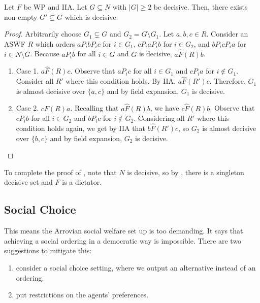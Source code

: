 	\begin{lemma}
		\label{lem: arrow group contraction}
		Let $F$ be WP and IIA. Let $G \subseteq N$ with $|G| \ge 2$ be decisive. Then, there exists non-empty $G' \subsetneq G$ which is decisive.
	\end{lemma}
	\begin{proof}
		Arbitrarily choose $G_1 \subsetneq G$ and $G_2 = G \setminus G_1$. Let $a,b,c \in R$. Consider an ASWF $R$ which orders $a P_i b P_i c$ for $i \in G_1$, $c P_i a P_i b$ for $i \in G_2$, and $b P_i c P_i a$ for $i \in N \setminus G$. Because $a P_i b$ for all $i \in G$ and $G$ is decisive, $a \hat{F}(R) b$.
		\begin{enumerate}
			\item Case 1. $a \hat{F}(R) c$. Observe that $a P_i c$ for all $i \in G_1$ and $c P_i a$ for $i \not\in G_1$. Consider all $R'$ where this condition holds. By IIA, $a \hat{F}(R') c$. Therefore, $G_1$ is almost decisive over $\{a,c\}$ and by field expansion, $G_1$ is decisive.
			\item Case 2. $c F(R) a$. Recalling that $a \hat{F}(R) b$, we have $c \hat{F}(R) b$. Observe that $c P_i b$ for all $i \in G_2$ and $b P_i c$ for $i \not\in G_2$. Considering all $R'$ where this condition holds again, we get by IIA that $b \hat{F}(R') c$, so $G_2$ is almost decisive over $\{b,c\}$ and by field expansion, $G_2$ is decisive. \qedhere
		\end{enumerate}
	\end{proof}

	To complete the proof of , note that $N$ is decisive, so by , there is a singleton decisive set and $F$ is a dictator.

\subsection{Social Choice}

	This means the Arrovian social welfare set up is too demanding. It says that achieving a social ordering in a democratic way is impossible. There are two suggestions to mitigate this:
	\begin{enumerate}
		\item consider a social choice setting, where we output an alternative instead of an ordering.
		\item put restrictions on the agents' preferences.
	\end{enumerate}

